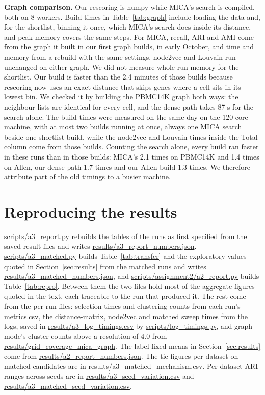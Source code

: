 \textbf{Graph comparison.} Our rescoring is numpy while MICA's search is compiled, both on 8 workers. Build times in Table~\ref{tab:graph} include loading the data and, for the shortlist,
binning it once, which MICA's search does inside its distance, and peak memory covers the same steps. For MICA, recall,
ARI and AMI come from the graph it built in our first graph builds, in early October, and time and memory from a rebuild with the same settings.
node2vec and Louvain run unchanged on either graph. We did not measure whole-run memory for the shortlist. Our build is faster than the 2.4 minutes of those builds because rescoring
now uses an exact distance that skips genes where a cell sits in its lowest bin. We checked it by building the
PBMC14K graph both ways: the neighbour lists are identical for every cell, and the dense path takes 87 s for the
search alone. The build times were measured on the same day on the 120-core machine, with at most two builds
running at once, always one MICA search beside one shortlist build, while the node2vec and Louvain times inside
the Total column come from those builds. Counting the search alone, every build ran faster in these runs
than in those builds: MICA's 2.1 times on PBMC14K and 1.4 times on Allen, our dense path 1.7 times and our Allen
build 1.3 times. We therefore attribute part of the old timings to a busier machine.

\section{Reproducing the results}\label{app:repro}
\url{scripts/a3_report.py} rebuilds the tables of the runs as first specified
from the saved result files and writes \url{results/a3_report_numbers.json}.
\url{scripts/a3_matched.py} builds Table~\ref{tab:transfer} and the exploratory values quoted in
Section~\ref{sec:results} from the matched runs and writes \url{results/a3_matched_numbers.json}, and
\url{scripts/assignment2/a2_report.py} builds Table~\ref{tab:repro}.
Between them the two files hold most of the aggregate figures quoted in the text, each
traceable to the run that produced it. The rest come from the per-run files: selection times and
clustering counts from each run's \url{metrics.csv}, the distance-matrix, node2vec and matched
sweep times from the logs, saved in \url{results/a3_log_timings.csv} by
\url{scripts/log_timings.py}, and graph mode's cluster counts above a resolution of 4.0 from
\url{results/grid_coverage_mica_graph}. The label-fixed means in Section~\ref{sec:results} come from \url{results/a2_report_numbers.json}. The tie figures per dataset on matched candidates are in
\url{results/a3_matched_mechanism.csv}. Per-dataset ARI ranges across seeds are in
\url{results/a3_seed_variation.csv} and \url{results/a3_matched_seed_variation.csv}.

